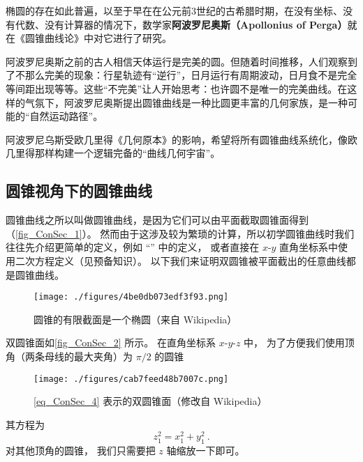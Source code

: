 
\begin{issues}
\issueDraft
\end{issues}





椭圆的存在如此普遍，以至于早在在公元前3世纪的古希腊时期，在没有坐标、没有代数、没有计算器的情况下，数学家\textbf{阿波罗尼奥斯（Apollonius of Perga）}就在《圆锥曲线论》中对它进行了研究。

阿波罗尼奥斯之前的古人相信天体运行是完美的圆。但随着时间推移，人们观察到了不那么完美的现象：行星轨迹有“逆行”，日月运行有周期波动，日月食不是完全等间距出现等等。这些“不完美”让人开始思考：也许圆不是唯一的完美曲线。在这样的气氛下，阿波罗尼奥斯提出圆锥曲线是一种比圆更丰富的几何家族，是一种可能的“自然运动路径”。


阿波罗尼乌斯受欧几里得《几何原本》的影响，希望将所有圆锥曲线系统化，像欧几里得那样构建一个逻辑完备的“曲线几何宇宙”。


\subsection{圆锥视角下的圆锥曲线}

圆锥曲线之所以叫做圆锥曲线，是因为它们可以由平面截取圆锥面得到（\autoref{fig_ConSec_1}）。 然而由于这涉及较为繁琐的计算，所以初学圆锥曲线时我们往往先介绍更简单的定义，例如 “” 中的定义， 或者直接在 $x$-$y$ 直角坐标系中使用二次方程定义（见预备知识）。 以下我们来证明双圆锥被平面截出的任意曲线都是圆锥曲线。

\begin{figure}[ht]
\centering
\texttt{[image: ./figures/4be0db073edf3f93.png]}
\caption{圆锥的有限截面是一个椭圆（来自 Wikipedia）} \label{fig_ConSec_1}
\end{figure}

双圆锥面如\autoref{fig_ConSec_2} 所示。 在直角坐标系 $x$-$y$-$z$ 中， 为了方便我们使用顶角（两条母线的最大夹角）为 $\pi/2$ 的圆锥
\begin{figure}[ht]
\centering
\texttt{[image: ./figures/cab7feed48b7007c.png]}
\caption{\autoref{eq_ConSec_4} 表示的双圆锥面（修改自 Wikipedia）} \label{fig_ConSec_2}
\end{figure}
其方程为
\begin{equation}\label{eq_ConSec_4}
z_1^2 = x_1^2 + y_1^2~.
\end{equation}
对其他顶角的圆锥， 我们只需要把 $z$ 轴缩放一下即可。

